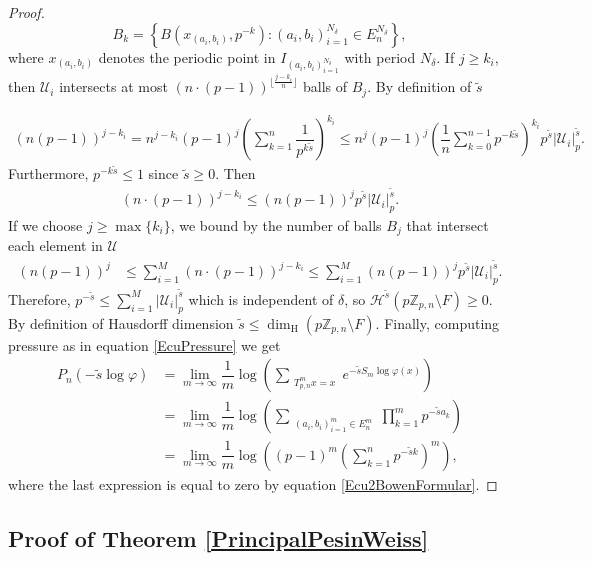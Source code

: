 \documentclass[11pt]{amsart}
\theoremstyle{remark}
\numberwithin{equation}{section}
\newcommand{\Z}{\mathbb{Z}}
\newcommand{\Ucali}{\mathcal{U}}
\begin{document}
\begin{proof}
$$B_{k}=\left\{B\left( x_{(a_i,b_i)},p^{-k} \right):(a_i,b_i)_{i=1}^{N_{\delta}}\in E_{n}^{N_{\delta}}\right\},$$ 
where $ x_{(a_i,b_i)}$ denotes the periodic point in $I_{(a_i,b_i)_{i=1}^{N_{\delta}}}$ with period $N_{\delta}$.  If $j\geq k_i$, then $\Ucali_{i}$ intersects at most $(n\cdot(p-1))^{\lfloor \frac{j-k_{i}}{n}\rfloor}$ balls of $B_{j}$. By definition of $\tilde{s}$

\begin{align*}
\left( n(p-1)\right)^{j-k_i}=n^{j-k_i}(p-1)^{j}\left(\sum_{k=1}^n \dfrac{1}{p^{k\tilde s}} \right)^{k_i}\leq n^{j}(p-1)^j\left(\dfrac{1}{n}\sum_{k=0}^{n-1}p^{-k\tilde s} \right)^{k_i}p^{\tilde s}|\Ucali_i|_p^{\tilde s}.
\end{align*}
Furthermore, $p^{-k\tilde{s}}\leq 1$ since $\tilde{s}\geq 0$. Then
\begin{align*}
    (n\cdot (p-1))^{j-k_{i}}\leq (n(p-1))^{j}p^{\tilde{s}}|\Ucali_{i}|^{\tilde{s}}_{p}.
\end{align*}If we choose $j\geq \max\{k_{i}\}$, we bound by the number of balls $B_{j}$ that intersect each element in $\mathcal{U}$
\begin{align*}
    (n(p-1))^{j}&\leq \sum_{i=1}^{M}(n\cdot (p-1))^{j-k_{i}} \leq \sum_{i=1}^{M} (n(p-1))^{j}p^{\tilde{s}}|\Ucali_{i}|^{\tilde{s}}_{p}.
\end{align*}Therefore, $p^{-\tilde{s}}\leq \sum_{i=1}^{M}|\Ucali_{i}|_{p}^{\tilde{s}} $ which is independent of $\delta$, so $\mathcal{H}^{\tilde{s}}(p\Z_{p,n}\setminus F)\geq 0$. By definition of Hausdorff dimension $\tilde{s}\leq \dim_{\mathrm{H}}\left(p\Z_{p,n}\setminus F\right)$. Finally, computing pressure as in equation \eqref{EcuPressure} we get
\begin{align*}
    P_n(-\tilde s \log \varphi)&=\lim_{m\to \infty} \dfrac{1}{m}\log \left(\sum_{\substack{T_{p,n}^m x=x}} e^{-\tilde{s}S_m \log \varphi(x)} \right)\\
    &=\lim_{m\to \infty}\dfrac{1}{m}\log \left( \sum_{\substack{(a_i,b_i)_{i=1}^m \in E_{n}^{m}}}\prod_{k=1}^{m}p^{-\tilde{s}a_{k}}\right)\\
    &= \lim_{m\to \infty}\dfrac{1}{m}\log\left((p-1)^{m}
    \left(\sum^{n}_{k=1}p^{-\tilde{s}k}\right)^{m}\right),
\end{align*}where the last expression is equal to zero by equation \eqref{Ecu2BowenFormular}.

\end{proof}


\subsection{Proof of Theorem \ref{PrincipalPesinWeiss}}
\end{document}

